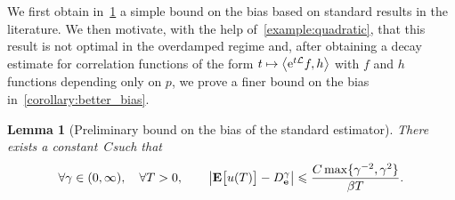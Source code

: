 \documentclass[11pt,a4paper]{article}
\newcommand{\e}{\mathrm{e}}
\newcommand{\expect}[0]{\mathbf{E}}
\newcommand{\vect}[1]{\boldsymbol{\mathbf #1}}
\renewcommand{\d}{\mathrm d}
\theoremstyle{plain}
\newtheorem{lemma}[theorem]{Lemma}
\numberwithin{equation}{section}
\renewcommand{\leq}{\leqslant}
\begin{document}
We first obtain in~\cref{lemma:easy_lemma} a simple bound on the bias based on standard results in the literature.
We then motivate, with the help of~\cref{example:quadratic},
that this result is not optimal in the overdamped regime and,
after obtaining a decay estimate for correlation functions of the form $t \mapsto \ip{\e^{t \mathcal L} f}{h}$ with $f$ and $h$ functions depending only on $p$,
we prove a finer bound on the bias in~\cref{corollary:better_bias}.

\begin{lemma}
    [Preliminary bound on the bias of the standard estimator]
    \label{lemma:easy_lemma}
    There exists a constant~$C$such that
    \begin{equation}
        \label{eq:bias_simple}
        \forall \gamma \in (0, \infty),
        \quad
        \forall T > 0,
        \qquad
        \abs{\expect \bigl[u(T)\bigr] - D_{\vect e}^{\gamma}}
        \leq
        \frac{C \max \{\gamma^{-2}, \gamma^2\}}{\beta T}.
    \end{equation}
\end{lemma}
\end{document}
